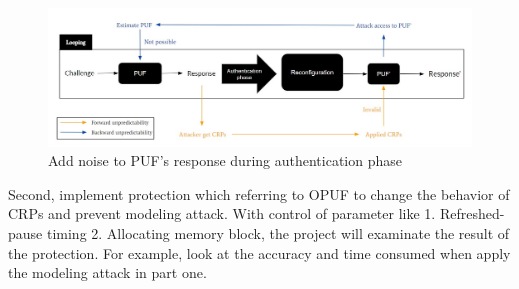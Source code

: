 \begin{figure}[htp]
    \centering
    \includegraphics[width=14cm]{figures/figure8.jpg}
    \caption{Add noise to PUF's response during authentication phase}
    \label{fig:figure10}
    \end{figure}

Second, implement protection which referring to OPUF to change the behavior of CRPs and prevent modeling attack. With control of parameter like 1. Refreshed-pause timing 2. Allocating memory block, 
the project will examinate the result of the protection. For example, look at the accuracy and time consumed when apply the modeling attack in part one.





